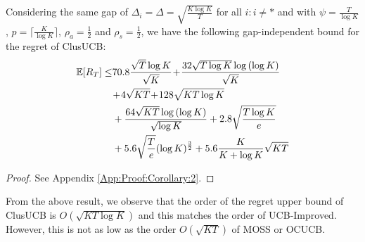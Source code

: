 \begin{corollary}
\label{Result:Corollary:2}
Considering the same gap of $\Delta_{i} = \Delta =\sqrt{\frac{K\log K}{T}}$ for all ${i:i\neq *}$ and with $\psi=\frac{T}{\log K}$, $p=\big\lceil\frac{K}{\log K}\big\rceil$, $\rho_{a}=\frac{1}{2}$ and $\rho_{s}=\frac{1}{2}$, 
 we have the following gap-independent bound for the regret of ClusUCB:
\begin{align*}
 \mathbb{E}[R_{T}]\le & 70.8\frac{\sqrt{T}\log K}{\sqrt{K}} \!+\! \frac{32\sqrt{T\log K}\log{(\log K)}}{\sqrt{K}}\\
  &\!+\! 4\sqrt{KT} \!+\! 128\sqrt{KT\log K}\\
	& + \frac{64\sqrt{KT}\log{(\log K)}}{\sqrt{\log K}} + 2.8\sqrt{\frac{T\log K}{e}}\\
	& + 5.6\sqrt{\frac{T}{e}}(\log K)^{\frac{3}{2}} + 5.6 \frac{K}{K+\log K}\sqrt{KT}
\end{align*}
\end{corollary}
\begin{proof}
 See Appendix \ref{App:Proof:Corollary:2}.
\end{proof}


From the above result, we observe that the order of the regret upper bound of ClusUCB is $O(\sqrt{KT\log K})$ and this matches the order of UCB-Improved. However, this is not as low as the order $O(\sqrt{KT})$ of MOSS or OCUCB. 

